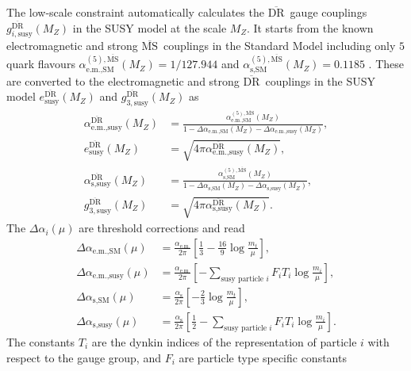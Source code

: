 \documentclass[final,3p,11pt,pdflatex]{elsarticle}
\newcommand{\textoverline}[1]{$\overline{\mbox{#1}}$}
\newcommand{\DRbar}{\textoverline{DR}\xspace}
\newcommand{\MSbar}{\textoverline{MS}\xspace}
\begin{document}
The low-scale constraint automatically calculates the \DRbar\ gauge
couplings $g_{i,\text{susy}}^{\text{\DRbar}}(M_Z)$ in the SUSY model
at the scale $M_Z$.  It starts from the known electromagnetic and
strong \MSbar\ couplings in the Standard Model including only $5$
quark flavours
$\alpha_{\text{e.m.},\text{SM}}^{(5),\text{\MSbar}}(M_Z) = 1/127.944$
and $\alpha_{\text{s},\text{SM}}^{(5),\text{\MSbar}}(M_Z) = 0.1185$
\cite{Beringer:1900zz}.  These are converted to the electromagnetic
and strong \DRbar\ couplings in the SUSY model
$e_{\text{susy}}^{\text{\DRbar}}(M_Z)$ and
$g_{3,\text{susy}}^{\text{\DRbar}}(M_Z)$ as
%
\begin{align}
  \alpha_{\text{e.m.},\text{susy}}^{\text{\DRbar}}(M_Z) &=
  \frac{\alpha_{\text{e.m.},\text{SM}}^{(5),\text{\MSbar}}(M_Z)}{1 -
    \Delta\alpha_{\text{e.m.},\text{SM}}(M_Z) -
    \Delta\alpha_{\text{e.m.},\text{susy}}(M_Z)} ,\\
    e_{\text{susy}}^{\text{\DRbar}}(M_Z) &=
    \sqrt{4\pi\alpha_{\text{e.m.},\text{susy}}^{\text{\DRbar}}(M_Z)}, \\
  \alpha_{\text{s},\text{susy}}^{\text{\DRbar}}(M_Z) &=
  \frac{\alpha_{\text{s},\text{SM}}^{(5),\text{\MSbar}}(M_Z)}{1 -
    \Delta\alpha_{\text{s},\text{SM}}(M_Z)
    - \Delta\alpha_{\text{s},\text{susy}}(M_Z)} ,\\
  g_{3,\text{susy}}^{\text{\DRbar}}(M_Z) &=
  \sqrt{4\pi\alpha_{\text{s},\text{susy}}^{\text{\DRbar}}(M_Z)} .
\end{align}
%
The $\Delta\alpha_i(\mu)$ are threshold corrections and read
%
\begin{align}
  \Delta\alpha_{\text{e.m.},\text{SM}}(\mu) &=
  \frac{\alpha_\text{e.m.}}{2\pi} \left[\frac{1}{3}
    - \frac{16}{9} \log{\frac{m_t}{\mu}} \right],\\
  \Delta\alpha_{\text{e.m.},\text{susy}}(\mu) &=
  \frac{\alpha_\text{e.m.}}{2\pi} \left[ -\sum_{\text{susy particle }
      i}
    F_i T_i \log{\frac{m_i}{\mu}} \right],\\
  \Delta\alpha_{\text{s},\text{SM}}(\mu) &=
  \frac{\alpha_\text{s}}{2\pi} \left[
    -\frac{2}{3} \log{\frac{m_t}{\mu}} \right],\\
  \Delta\alpha_{\text{s},\text{susy}}(\mu) &=
  \frac{\alpha_\text{s}}{2\pi}\left[ \frac{1}{2}-\sum_{\text{susy
        particle } i} F_i T_i \log{\frac{m_i}{\mu}} \right] .
\end{align}
%
The constants $T_i$ are the dynkin indices of the representation of
particle $i$ with respect to the gauge group, and $F_i$ are particle
type specific constants \cite{Hall:1980kf}
\end{document}
